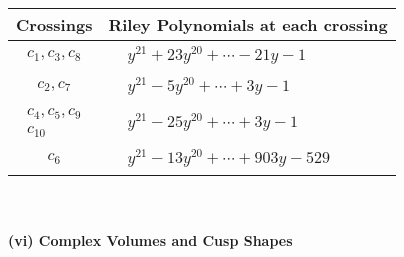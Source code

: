 \documentclass[1p]{elsarticle_modified}
\theoremstyle{definition}
\begin{document}
\begin{tabular}{m{50pt}|m{274pt}}
Crossings & \hspace{64pt}Riley Polynomials at each crossing \\
\hline $$\begin{aligned}c_{1},c_{3},c_{8}\end{aligned}$$&$\begin{aligned}
&y^{21}+23 y^{20}+\cdots-21 y-1
\end{aligned}$\\
\hline $$\begin{aligned}c_{2},c_{7}\end{aligned}$$&$\begin{aligned}
&y^{21}-5 y^{20}+\cdots+3 y-1
\end{aligned}$\\
\hline $$\begin{aligned}c_{4},c_{5},c_{9}\\c_{10}\end{aligned}$$&$\begin{aligned}
&y^{21}-25 y^{20}+\cdots+3 y-1
\end{aligned}$\\
\hline $$\begin{aligned}c_{6}\end{aligned}$$&$\begin{aligned}
&y^{21}-13 y^{20}+\cdots+903 y-529
\end{aligned}$\\
\hline
\end{tabular}\\~\\
\newpage\flushleft \textbf{(vi) Complex Volumes and Cusp Shapes}
\end{document}
